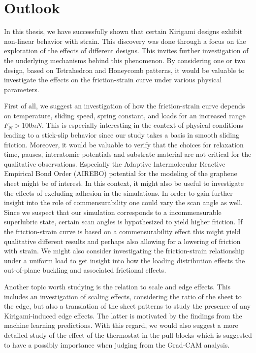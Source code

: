 \section{Outlook}

In this thesis, we have successfully shown that certain Kirigami designs exhibit non-linear behavior with strain. This discovery was done through a focus on the exploration of the effects of different designs. This invites further investigation of the underlying mechanisms behind this phenomenon. By considering one or two design, based on Tetrahedron and Honeycomb patterns, it would be valuable to investigate the effects on the friction-strain curve under various physical parameters. 

First of all, we suggest an investigation of how the friction-strain curve
depends on temperature, sliding speed, spring constant, and loads for an
increased range $F_N > 100 nN$. This is especially interesting in the context of
physical conditions leading to a stick-slip behavior since our study takes a
basis in smooth sliding friction. Moreover, it would be valuable to verify that
the choices for relaxation time, pauses, interatomic potentials and substrate
material are not critical for the qualitative observations. Especially the
Adaptive Intermolecular Reactive Empirical Bond Order (AIREBO) potential for the
modeling of the graphene sheet might be of interest. In this context, it might
also be useful to investigate the effects of excluding adhesion in the
simulations. In order to gain further insight into the role of commensurability
one could vary the scan angle as well. Since we suspect that our simulation
corresponds to a incommensurable superlubric state, certain scan angles is
hypothesized to yield higher friction. If the friction-strain curve is based on a commensurability effect this might yield qualitative different results and perhaps also allowing for a lowering of friction with strain. We might also consider investigating the friction-strain relationship under a uniform load to get insight into how the loading distribution effects the out-of-plane buckling and associated frictional effects.

Another topic worth studying is the relation to scale and edge effects. This includes an investigation of scaling effects, considering the ratio of the sheet to the edge, but also a translation of the sheet patterns to study the presence of any Kirigami-induced edge effects. The latter is motivated by the findings from the machine learning predictions. With this regard, we would also suggest a more detailed study of the effect of the thermostat in the pull blocks which is suggested to have a possibly importance when judging from the Grad-CAM analysis. 

